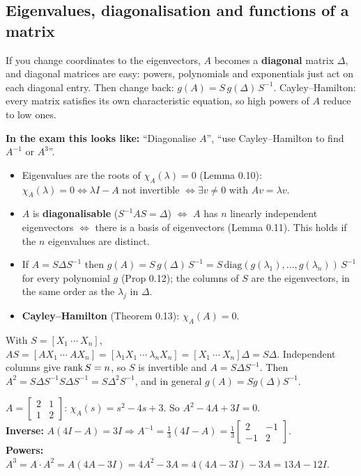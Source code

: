 \subsection{Eigenvalues, diagonalisation and functions of a matrix \texorpdfstring{}{}}\label{ss:2-5}
\begin{plainbox}
If you change coordinates to the eigenvectors, $A$ becomes a \textbf{diagonal} matrix $\Delta$, and diagonal matrices are easy:
powers, polynomials and exponentials just act on each diagonal entry. Then change back: $g(A)=S\,g(\Delta)\,S^{-1}$.
Cayley--Hamilton: every matrix satisfies its own characteristic equation, so high powers of $A$ reduce to low ones.
\par\smallskip\textbf{In the exam this looks like:} ``Diagonalise $A$'', ``use Cayley--Hamilton to find $A^{-1}$ or $A^3$''.
\end{plainbox}
\begin{thmbox}
\begin{itemize}
\item Eigenvalues are the roots of $\chi_A(\lambda)=0$ (Lemma 0.10): $\chi_A(\lambda)=0\iff\lambda I-A$ not invertible $\iff\exists v\ne0$ with $Av=\lambda v$.
\item $A$ is \textbf{diagonalisable} ($S^{-1}AS=\Delta$) $\iff$ $A$ has $n$ linearly independent eigenvectors $\iff$ there is a basis of eigenvectors (Lemma 0.11). This holds if the $n$ eigenvalues are distinct.
\item If $A=S\Delta S^{-1}$ then $g(A)=S\,g(\Delta)\,S^{-1}=S\,\mathrm{diag}(g(\lambda_1),\dots,g(\lambda_n))\,S^{-1}$ for every polynomial $g$ (Prop 0.12); the columns of $S$ are the eigenvectors, in the same order as the $\lambda_j$ in $\Delta$.
\item \textbf{Cayley--Hamilton} (Theorem 0.13): $\chi_A(A)=0$.
\end{itemize}
\end{thmbox}
\begin{proofbox}[title={Proof that $AS=S\Delta$ \fr{49}}]
With $S=[X_1\ \cdots\ X_n]$, $AS=[AX_1\ \cdots\ AX_n]=[\lambda_1X_1\ \cdots\ \lambda_nX_n]=[X_1\ \cdots\ X_n]\Delta=S\Delta$. Independent columns give $\operatorname{rank} S=n$, so $S$ is invertible and $A=S\Delta S^{-1}$.
Then $A^2=S\Delta S^{-1}S\Delta S^{-1}=S\Delta^2S^{-1}$, and in general $g(A)=Sg(\Delta)S^{-1}$.
\end{proofbox}
\begin{workbox}[title={Worked example: using Cayley--Hamilton}]
$A=\begin{bmatrix}2&1\\1&2\end{bmatrix}$: $\chi_A(s)=s^2-4s+3$. So $A^2-4A+3I=0$.\\
\textbf{Inverse:} $A(4I-A)=3I\Rightarrow A^{-1}=\frac13(4I-A)=\frac13\begin{bmatrix}2&-1\\-1&2\end{bmatrix}$.\\
\textbf{Powers:} $A^3=A\cdot A^2=A(4A-3I)=4A^2-3A=4(4A-3I)-3A=13A-12I$.
\end{workbox}

